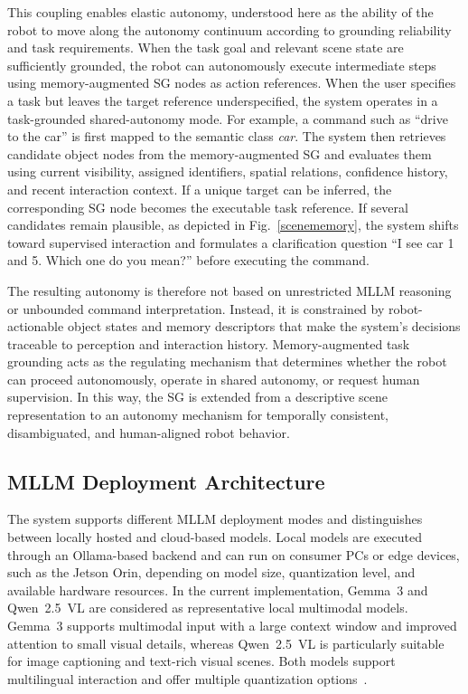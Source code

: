 \documentclass[lettersize,journal]{IEEEtran}
\begin{document}
This coupling enables elastic autonomy, understood here as the ability of the robot to move along the autonomy continuum according to grounding reliability and task requirements. When the task goal and relevant scene state are sufficiently grounded, the robot can autonomously execute intermediate steps using memory-augmented SG nodes as action references. When the user specifies a task but leaves the target reference underspecified, the system operates in a task-grounded shared-autonomy mode. For example, a command such as ``drive to the car'' is first mapped to the semantic class \textit{car}. The system then retrieves candidate object nodes from the memory-augmented SG and evaluates them using current visibility, assigned identifiers, spatial relations, confidence history, and recent interaction context. If a unique target can be inferred, the corresponding SG node becomes the executable task reference. If several candidates remain plausible, as depicted in Fig.~\ref{scenememory}, the system shifts toward supervised interaction and formulates a clarification question ``I see car 1 and 5. Which one do you mean?'' before executing the command.

The resulting autonomy is therefore not based on unrestricted MLLM reasoning or unbounded command interpretation. Instead, it is constrained by robot-actionable object states and memory descriptors that make the system's decisions traceable to perception and interaction history. Memory-augmented task grounding acts as the regulating mechanism that determines whether the robot can proceed autonomously, operate in shared autonomy, or request human supervision. In this way, the SG is extended from a descriptive scene representation to an autonomy mechanism for temporally consistent, disambiguated, and human-aligned robot behavior.

\subsection{MLLM Deployment Architecture}
\label{mllm_deployment_architecture}

The system supports different MLLM deployment modes and distinguishes between locally hosted and cloud-based models. Local models are executed through an Ollama-based backend and can run on consumer PCs or edge devices, such as the Jetson Orin, depending on model size, quantization level, and available hardware resources. In the current implementation, Gemma~3 and Qwen~2.5~VL are considered as representative local multimodal models. Gemma~3 supports multimodal input with a large context window and improved attention to small visual details, whereas Qwen~2.5~VL is particularly suitable for image captioning and text-rich visual scenes. Both models support multilingual interaction and offer multiple quantization options~\cite{gemma3,qwen25vl}.
\end{document}
